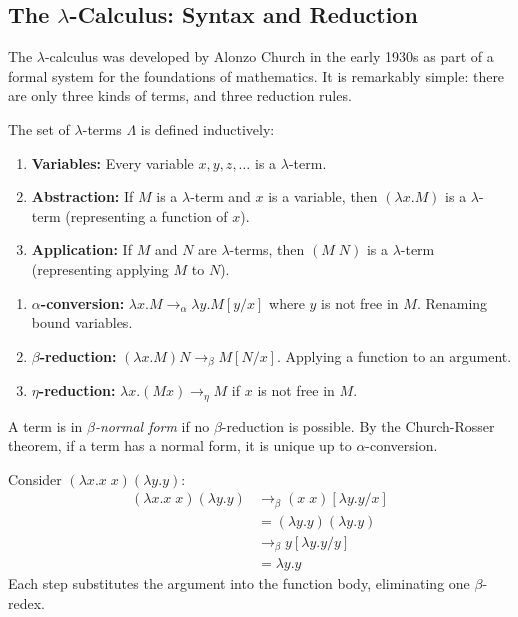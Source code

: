 \subsection{The \texorpdfstring{$\lambda$}{λ}-Calculus: Syntax and Reduction}
\label{sec:computation:lambda}

The $\lambda$-calculus was developed by Alonzo Church in the early 1930s as part of a formal system for the foundations of mathematics. It is remarkably simple: there are only three kinds of terms, and three reduction rules.

\begin{definition}
The set of $\lambda$-terms $\Lambda$ is defined inductively:
\begin{enumerate}
\item \textbf{Variables:} Every variable $x, y, z, \ldots$ is a $\lambda$-term.
\item \textbf{Abstraction:} If $M$ is a $\lambda$-term and $x$ is a variable, then $(\lambda x. M)$ is a $\lambda$-term (representing a function of $x$).
\item \textbf{Application:} If $M$ and $N$ are $\lambda$-terms, then $(M\; N)$ is a $\lambda$-term (representing applying $M$ to $N$).
\end{enumerate}
\end{definition}

\begin{definition}
\begin{enumerate}
\item \textbf{$\alpha$-conversion:} $\lambda x. M \to_\alpha \lambda y. M[y/x]$ where $y$ is not free in $M$. Renaming bound variables.
\item \textbf{$\beta$-reduction:} $(\lambda x. M) N \to_\beta M[N/x]$. Applying a function to an argument.
\item \textbf{$\eta$-reduction:} $\lambda x. (M x) \to_\eta M$ if $x$ is not free in $M$.
\end{enumerate}
A term is in \emph{$\beta$-normal form} if no $\beta$-reduction is possible. By the Church-Rosser theorem, if a term has a normal form, it is unique up to $\alpha$-conversion.
\end{definition}

\begin{example}
Consider $(\lambda x. x\; x)(\lambda y. y)$:
\begin{align*}
(\lambda x. x\; x)(\lambda y. y)
&\to_\beta (x\; x)[\lambda y. y / x] \\
&= (\lambda y. y)(\lambda y. y) \\
&\to_\beta y[\lambda y. y / y] \\
&= \lambda y. y
\end{align*}
Each step substitutes the argument into the function body, eliminating one $\beta$-redex.
\end{example}

